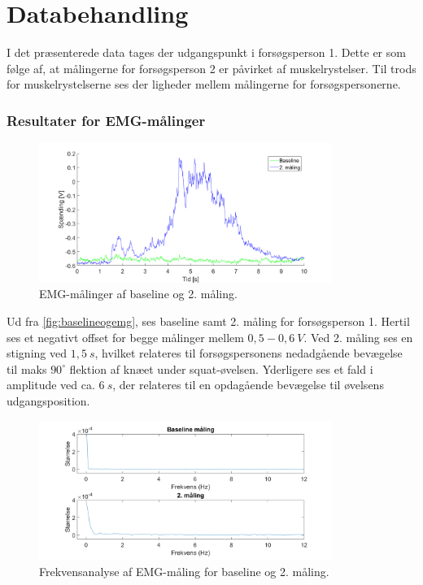 \section{Databehandling}
I det præsenterede data tages der udgangspunkt i forsøgsperson 1. Dette er som følge af, at målingerne for forsøgsperson 2 er påvirket af muskelrystelser. Til trods for muskelrystelserne ses der ligheder mellem målingerne for forsøgspersonerne. 

\subsubsection{Resultater for EMG-målinger}

\begin{figure}[H]
	\centering
	\includegraphics[width=0.85\textwidth]{figures/Pilotforsoeg/baselineogemg.png}
	\caption{EMG-målinger af baseline og 2. måling.}
	\label{fig:baselineogemg}
\end{figure}
Ud fra \autoref{fig:baselineogemg}, ses baseline samt 2. måling for forsøgsperson 1. Hertil ses et negativt offset for begge målinger mellem $0,5-0,6~V$. Ved 2. måling ses en stigning ved $1,5~s$, hvilket relateres til forsøgspersonens nedadgående bevægelse til maks $90^{\circ}$ flektion af knæet under squat-øvelsen. Yderligere ses et fald i amplitude ved ca. $6~s$, der relateres til en opdagående bevægelse til øvelsens udgangsposition. 


\begin{figure}[H]
	\centering
	\includegraphics[width=0.85\textwidth]{figures/Pilotforsoeg/emgfft.png}
	\caption{Frekvensanalyse af EMG-måling for baseline og 2. måling.}
	\label{fig:emgfft}
\end{figure}

